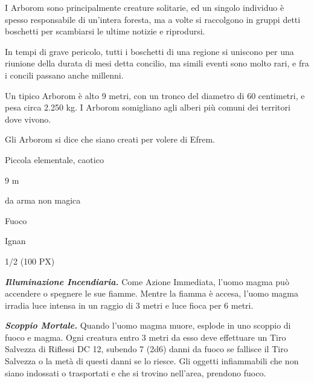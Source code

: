 \begin{multicols}{2}
{I Arborom sono principalmente creature solitarie, ed un singolo individuo è spesso responsabile di un'intera foresta, ma a volte si raccolgono in gruppi detti boschetti per scambiarsi le ultime notizie e riprodursi.

In tempi di grave pericolo, tutti i boschetti di una regione si uniscono per una riunione della durata di mesi detta concilio, ma simili eventi sono molto rari, e fra i concili passano anche millenni.

Un tipico Arborom è alto 9 metri, con un tronco del diametro di 60 centimetri, e pesa circa 2.250 kg. I Arborom somigliano agli alberi più comuni dei territori dove vivono.

Gli Arborom si dice che siano creati per volere di Efrem.

\begin{description}[noitemsep, topsep=0pt, parsep=0pt, partopsep=0pt, itemsep=1pt, leftmargin=2.35cm,  labelwidth=2.2cm, itemindent=0cm, listparindent=0pt] %
\setlength{\baselineskip}{10pt}
\item[\textbf{Taglia/Tipo}] Piccola elementale, caotico
\item[\textbf{Caratt.}] 
\item[\textbf{Punti Ferita}] 
\item[\textbf{Movimento}] 9 m
\item[\textbf{Tiri Salvez.}] 
\item[\textbf{Res. Danni}] da arma non magica\\
\item[\textbf{Imm. Danni}] Fuoco
\item[\textbf{Sensi}] 
\item[\textbf{Linguaggi}] Ignan
\item[\textbf{Sfida}] 1/2 (100 PX)
\end{description}
\smallskip

\emph{\textbf{Illuminazione Incendiaria.}} Come Azione Immediata, l'uomo magma può accendere o spegnere le sue fiamme. Mentre la fiamma è accesa, l'uomo magma irradia luce intensa in un raggio di 3 metri e luce fioca per 6 metri.

\emph{\textbf{Scoppio Mortale.}} Quando l'uomo magma muore, esplode in uno scoppio di fuoco e magma. Ogni creatura entro 3 metri da esso deve effettuare un Tiro Salvezza di Riflessi DC 12, subendo 7 (2d6) danni da fuoco se fallisce il Tiro Salvezza o la metà di questi danni se lo riesce. Gli oggetti infiammabili che non siano indossati o trasportati e che si trovino nell'area, prendono fuoco.

}
\end{multicols}
